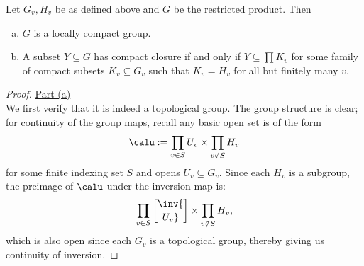 \documentclass[11pt, x11names, openany]{book}
\begin{document}
\begin{prop}
\label{prop: restricted product properties}
Let $G_v, H_v$ be as defined above and $G$ be the restricted product. Then
\begin{enumerate}[(a)]
    \item $G$ is a locally compact group.
    \item A subset $Y \subseteq G$ has compact closure if and only if $Y \subseteq \prod K_v$ for some family of compact subsets $K_v \subseteq G_v$ such that $K_v = H_v$ for all but finitely many $v$.
\end{enumerate}
\end{prop}
\begin{proof}
\underline{Part (a)}\\
We first verify that it is indeed a topological group. The group structure is clear; for continuity of the group maps, recall any basic open set is of the form
\begin{equation*}
    \calu := \prod_{v \in S} U_v \times \prod_{v \notin S} H_v
\end{equation*}
for some finite indexing set $S$ and opens $U_v \subseteq G_v$. Since each $H_v$ is a subgroup, the preimage of $\calu$ under the inversion map is:
\begin{equation*}
    \prod_{v \in S} \inv{\brack{U_v}} \times \prod_{v \notin S} H_v,
\end{equation*}
which is also open since each $G_v$ is a topological group, thereby giving us continuity of inversion.


\end{proof}
\end{document}
